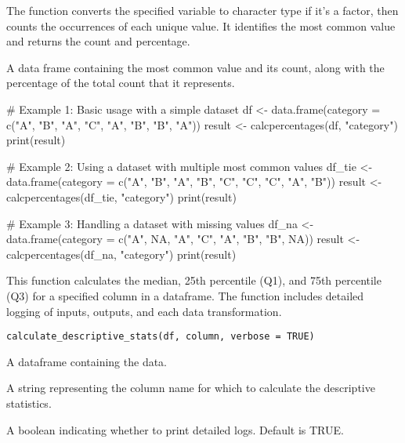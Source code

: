 \documentclass[a4paper]{book}
\begin{document}
%
\begin{Details}
The function converts the specified variable to character type if it's a factor, then counts the occurrences of each unique value. It identifies the most common value and returns the count and percentage.
\end{Details}
%
\begin{Value}
A data frame containing the most common value and its count, along with the percentage of the total count that it represents.
\end{Value}
%
\begin{Examples}
\begin{ExampleCode}
# Example 1: Basic usage with a simple dataset
df <- data.frame(category = c("A", "B", "A", "C", "A", "B", "B", "A"))
result <- calcpercentages(df, "category")
print(result)

# Example 2: Using a dataset with multiple most common values
df_tie <- data.frame(category = c("A", "B", "A", "B", "C", "C", "C", "A", "B"))
result <- calcpercentages(df_tie, "category")
print(result)

# Example 3: Handling a dataset with missing values
df_na <- data.frame(category = c("A", NA, "A", "C", "A", "B", "B", NA))
result <- calcpercentages(df_na, "category")
print(result)

\end{ExampleCode}
\end{Examples}
%
\begin{Description}
This function calculates the median, 25th percentile (Q1), and 75th percentile (Q3) for a specified column in a dataframe. The function includes detailed logging of inputs, outputs, and each data transformation.
\end{Description}
%
\begin{Usage}
\begin{verbatim}
calculate_descriptive_stats(df, column, verbose = TRUE)
\end{verbatim}
\end{Usage}
%
\begin{Arguments}
\begin{ldescription}
\item[\code{df}] A dataframe containing the data.

\item[\code{column}] A string representing the column name for which to calculate the descriptive statistics.

\item[\code{verbose}] A boolean indicating whether to print detailed logs. Default is TRUE.
\end{ldescription}
\end{Arguments}
\end{document}
